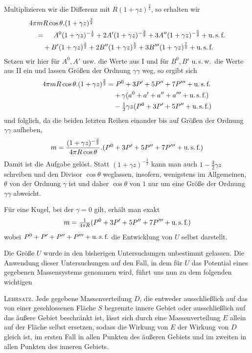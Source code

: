 Multiplizieren wir die Differenz mit $R(1+\gamma z)^{\frac32}$, so erhalten wir
\[
\begin{aligned}
&4\pi mR\cos\theta.(1+\gamma z)^{\frac32}\\
&\quad=\phantom{{}+{}}A^0(1+\gamma z)^{-\frac12}+2A'(1+\gamma z)^{-\frac32}+3A''(1+\gamma z)^{-\frac52}+\text{u.\,s.\,f.}\\
&\qquad+B'(1+\gamma z)^{\frac32}+2B''(1+\gamma z)^{\frac52}+3B'''(1+\gamma z)^{\frac72}+\text{u.\,s.\,f.}
\end{aligned}
\]
Setzen wir hier für $A^0,A'$ usw. die Werte aus I und für $B^0,B'$ u.\,s.\,w.\ die Werte aus II ein und lassen Größen der Ordnung $\gamma\gamma$ weg, so ergibt sich
\[
\begin{aligned}
4\pi mR\cos\theta.(1+\gamma z)^{\frac32}&=P^0+3P'+5P''+7P'''+\text{u.\,s.\,f.}\\
&\quad+\gamma(a^0+a'+a''+a'''+\text{u.\,s.\,f.})\\
&\quad-\tfrac12\gamma z(P^0+3P'+5P''+\text{u.\,s.\,f.})
\end{aligned}
\]
und folglich, da die beiden letzten Reihen einander bis auf Größen der Ordnung $\gamma\gamma$ aufheben,
\[
m=\frac{(1+\gamma z)^{-\frac32}}{4\pi R\cos\theta}.(P^0+3P'+5P''+7P'''+\text{u.\,s.\,f.})
\]
Damit ist die Aufgabe gelöst. Statt $(1+\gamma z)^{-\frac32}$ kann man auch $1-\frac32\gamma z$ schreiben und den Divisor $\cos\theta$ weglassen, insofern, wenigstens im Allgemeinen, $\theta$ von der Ordnung $\gamma$ ist und daher $\cos\theta$ von $1$ nur um eine Größe der Ordnung $\gamma\gamma$ abweicht.

Für eine Kugel, bei der $\gamma=0$ gilt, erhält man exakt
\[
m=\tfrac1{4\pi R}(P^0+3P'+5P''+7P'''+\text{u.\,s.\,f.})
\]
wobei $P^0+P'+P''+P'''+\text{u.\,s.\,f.}$ die Entwicklung von $U$ selbst darstellt.

Die Größe $U$ wurde in den bisherigen Untersuchungen unbestimmt gelassen. Die Anwendung dieser Untersuchungen auf den Fall, in dem für $U$ das Potential eines gegebenen Massensystems genommen wird, führt uns nun zu dem folgenden wichtigen

\textsc{Lehrsatz.} Jede gegebene Massenverteilung $D$, die entweder ausschließlich auf das von einer geschlossenen Fläche $S$ begrenzte innere Gebiet oder ausschließlich auf das äußere Gebiet beschränkt ist, lässt sich durch eine Massenverteilung $E$ allein auf der Fläche selbst ersetzen, sodass die
Wirkung von $E$ der Wirkung von $D$ gleich ist, im ersten Fall in allen Punkten des äußeren Gebiets und im zweiten in allen Punkten des inneren Gebiets.

